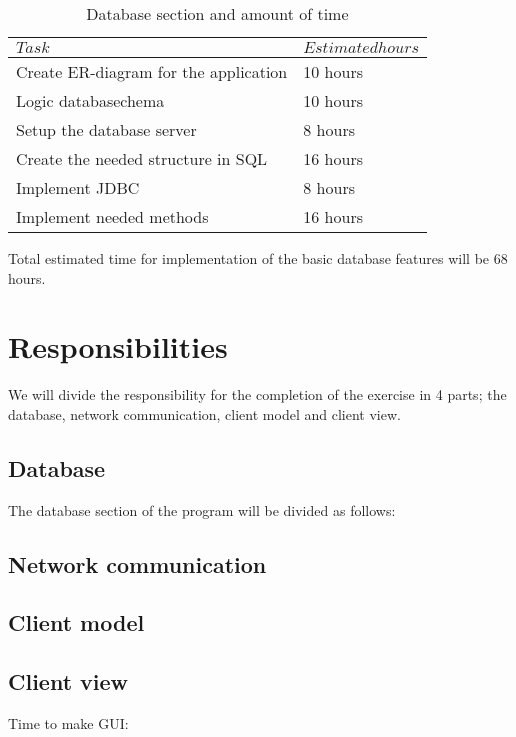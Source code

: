 \documentclass[a4paper, english, 12pt]{article}
\begin{document}
\begin{table}[h]
    \begin{center}
    \caption{Database section and amount of time} 
    \label{database}
    \vspace{0,5cm}
    \begin{tabular}{ll} \\ 
        \hline
        $Task$ & $Estimated hours$\\
        \hline 
    Create ER-diagram for the application & 10 hours\\
    Logic databasechema & 10 hours\\    
    Setup the database server & 8 hours\\
    Create the needed structure in SQL & 16 hours\\
    Implement JDBC & 8 hours\\
    Implement needed methods & 16 hours\\
        \hline
    \end{tabular}
    \end{center}
\end{table}

Total estimated time for implementation of the basic database features will be 68 hours.

\section{Responsibilities}
We will divide the responsibility for the completion of the exercise in 4 parts; the database, network communication, 
client model and client view. 
\subsection{Database}
The database section of the program will be divided as follows:



\subsection{Network communication}

\subsection{Client model}

\subsection{Client view}
Time to make GUI:
\end{document}
